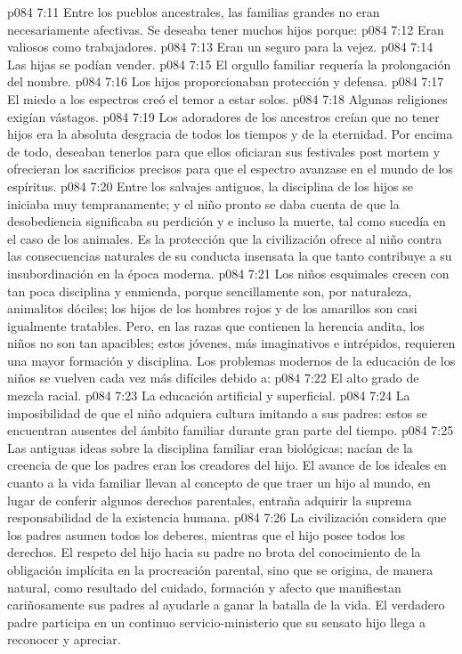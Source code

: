 \vs p084 7:11 Entre los pueblos ancestrales, las familias grandes no eran necesariamente afectivas. Se deseaba tener muchos hijos porque:
\vs p084 7:12 Eran valiosos como trabajadores.
\vs p084 7:13 Eran un seguro para la vejez.
\vs p084 7:14 Las hijas se podían vender.
\vs p084 7:15 El orgullo familiar requería la prolongación del nombre.
\vs p084 7:16 Los hijos proporcionaban protección y defensa.
\vs p084 7:17 El miedo a los espectros creó el temor a estar solos.
\vs p084 7:18 Algunas religiones exigían vástagos.
\vs p084 7:19 \pc Los adoradores de los ancestros creían que no tener hijos era la absoluta desgracia de todos los tiempos y de la eternidad. Por encima de todo, deseaban tenerlos para que ellos oficiaran sus festivales post mortem y ofrecieran los sacrificios precisos para que el espectro avanzase en el mundo de los espíritus.
\vs p084 7:20 Entre los salvajes antiguos, la disciplina de los hijos se iniciaba muy tempranamente; y el niño pronto se daba cuenta de que la desobediencia significaba su perdición y e incluso la muerte, tal como sucedía en el caso de los animales. Es la protección que la civilización ofrece al niño contra las consecuencias naturales de su conducta insensata la que tanto contribuye a su insubordinación en la época moderna.
\vs p084 7:21 Los niños esquimales crecen con tan poca disciplina y enmienda, porque sencillamente son, por naturaleza, animalitos dóciles; los hijos de los hombres rojos y de los amarillos son casi igualmente tratables. Pero, en las razas que contienen la herencia andita, los niños no son tan apacibles; estos jóvenes, más imaginativos e intrépidos, requieren una mayor formación y disciplina. Los problemas modernos de la educación de los niños se vuelven cada vez más difíciles debido a:
\vs p084 7:22 El alto grado de mezcla racial.
\vs p084 7:23 La educación artificial y superficial.
\vs p084 7:24 La imposibilidad de que el niño adquiera cultura imitando a sus padres: estos se encuentran ausentes del ámbito familiar durante gran parte del tiempo.
\vs p084 7:25 \pc Las antiguas ideas sobre la disciplina familiar eran biológicas; nacían de la creencia de que los padres eran los creadores del hijo. El avance de los ideales en cuanto a la vida familiar llevan al concepto de que traer un hijo al mundo, en lugar de conferir algunos derechos parentales, entraña adquirir la suprema responsabilidad de la existencia humana.
\vs p084 7:26 La civilización considera que los padres asumen todos los deberes, mientras que el hijo posee todos los derechos. El respeto del hijo hacia su padre no brota del conocimiento de la obligación implícita en la procreación parental, sino que se origina, de manera natural, como resultado del cuidado, formación y afecto que manifiestan cariñosamente sus padres al ayudarle a ganar la batalla de la vida. El verdadero padre participa en un continuo servicio\hyp{}ministerio que su sensato hijo llega a reconocer y apreciar.
